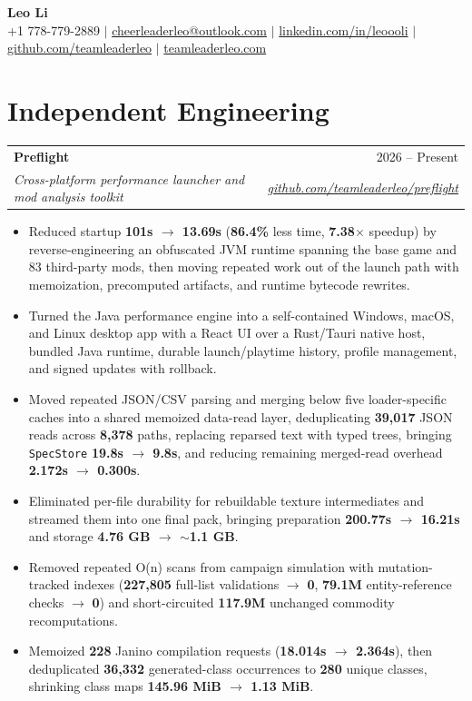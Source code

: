 \documentclass[letterpaper,11pt]{article}
\makeatletter
\newcommand{\resumeHeading}[4]{%
  \begin{tabularx}{\textwidth}{@{}Xr@{}}
    \textbf{#1} & #2 \\
    \textit{\small #3} & \textit{\small #4}
  \end{tabularx}\vspace{-2pt}
}
\newcommand{\resumeItemListStart}{\begin{itemize}[leftmargin=0.23in,itemsep=0.4pt,parsep=0pt,topsep=0.5pt]}
\newcommand{\resumeItem}[1]{\item\fontsize{10.2pt}{11.5pt}\selectfont #1}
\newcommand{\resumeItemListEnd}{\end{itemize}\vspace{-1.25pt}}
\makeatother
\begin{document}
\begin{center}
  {\Huge\textbf{Leo Li}} \\[2pt]
  \small
  +1 778-779-2889 $|$
  \href{mailto:cheerleaderleo@outlook.com}{cheerleaderleo@outlook.com} $|$
  \href{https://www.linkedin.com/in/leoooli/}{linkedin.com/in/leoooli} $|$
  \href{https://github.com/teamleaderleo}{github.com/teamleaderleo} $|$
  \href{https://teamleaderleo.com/}{teamleaderleo.com}
\end{center}
\vspace{-10pt}

\section{Independent Engineering}

\resumeHeading
  {Preflight}
  {2026 -- Present}
  {Cross-platform performance launcher and mod analysis toolkit}
  {\href{https://github.com/teamleaderleo/preflight}{github.com/teamleaderleo/preflight}}
\resumeItemListStart
  \resumeItem{Reduced startup \textbf{101s $\rightarrow$ 13.69s} (\textbf{86.4\%} less time, \textbf{7.38$\times$} speedup) by reverse-engineering an obfuscated JVM runtime spanning the base game and 83 third-party mods, then moving repeated work out of the launch path with memoization, precomputed artifacts, and runtime bytecode rewrites.}
  \resumeItem{Turned the Java performance engine into a self-contained Windows, macOS, and Linux desktop app with a React UI over a Rust/Tauri native host, bundled Java runtime, durable launch/playtime history, profile management, and signed updates with rollback.}
  \resumeItem{Moved repeated JSON/CSV parsing and merging below five loader-specific caches into a shared memoized data-read layer, deduplicating \textbf{39,017} JSON reads across \textbf{8,378} paths, replacing reparsed text with typed trees, bringing \texttt{SpecStore} \textbf{19.8s $\rightarrow$ 9.8s}, and reducing remaining merged-read overhead \textbf{2.172s $\rightarrow$ 0.300s}.}
  \resumeItem{Eliminated per-file durability for rebuildable texture intermediates and streamed them into one final pack, bringing preparation \textbf{200.77s $\rightarrow$ 16.21s} and storage \textbf{4.76 GB $\rightarrow$ $\sim$1.1 GB}.}
  \resumeItem{Removed repeated O(n) scans from campaign simulation with mutation-tracked indexes (\textbf{227,805} full-list validations $\rightarrow$ \textbf{0}, \textbf{79.1M} entity-reference checks $\rightarrow$ \textbf{0}) and short-circuited \textbf{117.9M} unchanged commodity recomputations.}
  \resumeItem{Memoized \textbf{228} Janino compilation requests (\textbf{18.014s $\rightarrow$ 2.364s}), then deduplicated \textbf{36,332} generated-class occurrences to \textbf{280} unique classes, shrinking class maps \textbf{145.96 MiB $\rightarrow$ 1.13 MiB}.}
\resumeItemListEnd
\end{document}
